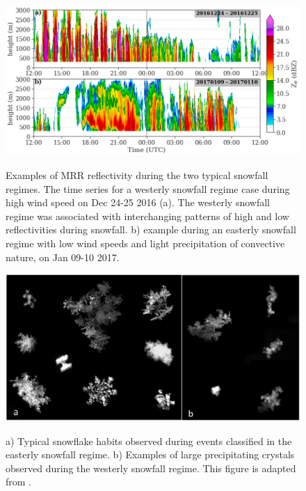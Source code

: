 \documentclass{ametsocV5}
\begin{document}
\begin{figure}[t]
	\noindent\includegraphics[width=\textwidth,angle=0]{fig4.png}\\
	\caption{Examples of MRR reflectivity during the two typical snowfall regimes. The time series for a westerly snowfall regime case during high wind speed on Dec 24-25 2016 (a). The westerly snowfall regime was associated with interchanging patterns of high and low reflectivities during snowfall. b) example during an easterly snowfall regime with low wind speeds and light precipitation of convective nature, on Jan 09-10 2017.
	}
	\label{fig:MRR_refl}
\end{figure}

\begin{figure}
	\noindent\includegraphics[width=\textwidth,angle=0]{fig5.jpg}\\
	\caption{a) Typical snowflake habits observed during events classified in the easterly snowfall regime. b) Examples of large precipitating crystals observed during the westerly snowfall regime. This figure is adapted from \protect\citet{schirle_estimation_2019}.
	}
	\label{fig:snowflakes}
\end{figure}
\end{document}
